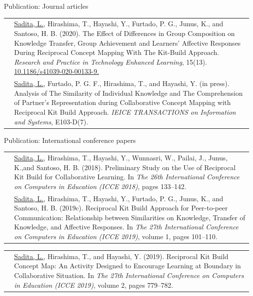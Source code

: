 \begin{frame}{Publication: Journal articles}
\begin{tabular}{p{15mm}p{80mm}}
    \tiny{\color{blue}{RPTEL 2020}} & {\small \underline{Sadita,  L.},  Hirashima,  T.,  Hayashi,  Y.,  Furtado,  P.  G.,  Junus,  K.,  and Santoso,  H.  B.  (2020).   The  Effect  of  Differences  in  Group  Composition on Knowledge Transfer, Group Achievement and Learners' Affective Responses During Reciprocal Concept Mapping With The Kit-Build Approach. \textit{Research and Practice in Technology Enhanced Learning}, 15(13).  \href{https://doi.org/10.1186/s41039-020-00133-9}{10.1186/s41039-020-00133-9.}}\\
    \tiny{\color{blue}{IEICE 2020}} & {\small\underline{Sadita, L.}, Furtado, P. G. F., Hirashima, T., and Hayashi, Y. (in press). Analysis of The Similarity of Individual Knowledge and The Comprehension of Partner’s Representation during Collaborative Concept Mapping with Reciprocal Kit Build Approach. \textit{IEICE  TRANSACTIONS  on Information and Systems}, E103-D(7)}. 
\end{tabular}
\end{frame}

\begin{frame}[allowframebreaks]{Publication: International conference papers}
\begin{tabular}{p{15mm}p{80mm}}
    \tiny{\color{blue}{ICCE 2018}} & {\small\underline{Sadita, L.}, Hirashima, T., Hayashi, Y., Wunnasri, W., Pailai, J., Junus, K.,and Santoso, H. B. (2018). Preliminary Study on the Use of Reciprocal Kit Build for Collaborative Learning.  In \textit{The  26th  International  Conference on Computers in Education (ICCE 2018)}, pages 133–142.}\\
    
    \tiny{\color{blue}{ICCE 2019}} & {\small \underline{Sadita,  L.},  Hirashima,  T.,  Hayashi,  Y.,  Furtado,  P.  G.,  Junus,  K.,  and Santoso, H. B. (2019c).  Reciprocal Kit Build Approach for Peer-to-peer Communication:  Relationship between Similarities on Knowledge, Transfer  of  Knowledge,  and  Affective  Responses. In \textit{The  27th International Conference  on  Computers  in  Education  (ICCE  2019)},  volume  1,  pages 101–110.}\\
\end{tabular}

\begin{tabular}{p{15mm}p{80mm}}
    \tiny{\color{blue}{ICCE-DSC 2019}} & {\small \underline{Sadita, L.}, Hirashima, T., and Hayashi, Y. (2019).  Reciprocal Kit Build Concept Map:  An Activity Designed to Encourage Learning at Boundary in Collaborative Situation.  In \textit{The 27th International Conference on Computers in Education (ICCE 2019)}, volume 2, pages 779–782.}
\end{tabular}
\end{frame}

